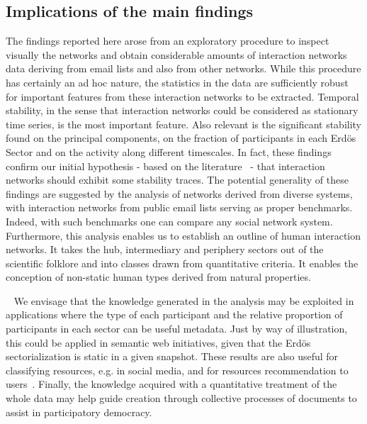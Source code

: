 \documentclass[%
aip,
jmp,%
amsmath,amssymb,
reprint,%
]{revtex4-1}
\begin{document}

\subsection{Implications of the main findings}\label{sec:impl}
The findings reported here arose from an exploratory procedure to inspect visually the networks and obtain considerable amounts of interaction networks data deriving from email lists and also from other networks. While this procedure has certainly an ad hoc nature, the statistics in the data are sufficiently robust for important features from these interaction networks to be extracted.
Temporal stability, in the sense that interaction networks could be considered as stationary time series, is the most important feature. Also relevant is the significant stability found on the principal components, on the fraction of participants in each Erd\"os Sector and on the activity along different timescales. In fact, these findings confirm our initial hypothesis - based on the literature~\cite{newmanBook} - that interaction networks should exhibit some stability traces. The potential generality of these findings are suggested by the analysis of networks derived from diverse systems, with interaction networks from public email lists serving as proper benchmarks. Indeed, with such benchmarks one can compare any social network system. Furthermore, this analysis enables us to establish an outline of human interaction networks. It takes the hub, intermediary and periphery sectors out of the scientific folklore and into classes drawn from quantitative criteria. It enables the conception of non-static human types derived from natural properties.

 
We envisage that the knowledge generated in the analysis may be exploited in applications where the type of each participant and the relative proportion of participants in each sector can be useful metadata. Just by way of illustration, this could be applied in semantic web initiatives, given that the Erd\"os sectorialization is static in a given snapshot. These results are also useful for classifying resources, e.g. in social media, and for resources recommendation to users~\cite{opa}. 
Finally, the knowledge acquired with a quantitative treatment of the whole data may help guide creation through collective processes of documents to assist in participatory democracy.
\end{document}
